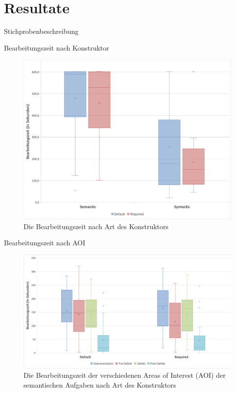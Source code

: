 \documentclass[10pt]{beamer}
\begin{document}
\section{Resultate}

	\begin{frame}{Stichprobenbeschreibung}
	 
	\end{frame}

	\begin{frame}{Bearbeitungszeit nach Konstruktor}
		\begin{figure}
			\includegraphics[scale=0.37]{graphics/box_time-constructor.png}
			\caption{\label{fig:box_time-constructor.png} Die Bearbeitungszeit nach Art des Konstruktors}
		\end{figure}
	\end{frame}

	\begin{frame}{Bearbeitungszeit nach AOI}
		\begin{figure}
			\includegraphics[scale=0.39]{graphics/box_time-aoi_sem.png}
			\caption{\label{fig:box_time-aoi_sem.png} Die Bearbeitungszeit der verschiedenen Areas of Interest (AOI) der semantischen Aufgaben nach Art des Konstruktors}
		\end{figure}
	\end{frame}
\end{document}
